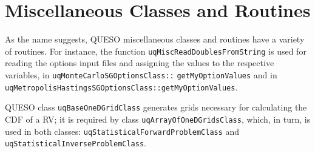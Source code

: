 % 

\section{Miscellaneous Classes and Routines}
 
As the name suggests, QUESO miscellaneous classes and routines have a variety of routines.
For instance, the function \verb+uqMiscReadDoublesFromString+ is used for reading the options input files and assigning the values to the respective variables, in \texttt{uqMonteCarloSGOptionsClass::} \texttt{getMyOptionValues} and in \verb+uqMetropolisHastingsSGOptionsClass::getMyOptionValues+. 

QUESO class \verb+uqBaseOneDGridClass+ generates grids necessary for calculating the CDF of a RV; it is required by class \verb+uqArrayOfOneDGridsClass+, which, in turn, is used in both classes: \linebreak \verb+uqStatisticalForwardProblemClass+ and \verb+uqStatisticalInverseProblemClass+.

